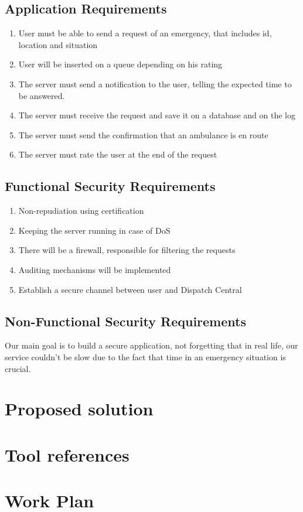 \documentclass[a4paper,titlepage,11pt]{article}
\begin{document}
	\subsection{Application Requirements}
		\begin{enumerate}
			\item User must be able to send a request of an emergency, that includes id, location and situation

			\item User will be inserted on a queue depending on his rating
			
			\item The server must send a notification to the user, telling the expected time to be answered. 

			\item The server must receive the request and save it on a database and on the log

			\item The server must send the confirmation that an ambulance is en route 

			\item The server must rate the user at the end of the request

			
			

 
		\end{enumerate}

	\subsection{Functional Security Requirements}
		\begin{enumerate}
			\item Non-repudiation using certification
			
			\item Keeping the server running in case of DoS
			
			\item There will be a firewall, responsible for filtering the requests

			\item Auditing mechanisms will be implemented

			\item Establish a secure channel between user and Dispatch Central

		\end{enumerate}
	\subsection{Non-Functional Security Requirements}
			Our main goal is to build a secure application, not forgetting that in real life, our service couldn't be slow due to the fact that time in an emergency situation is crucial.


\section{Proposed solution}

\section{Tool references}

\section{Work Plan}
\end{document}
